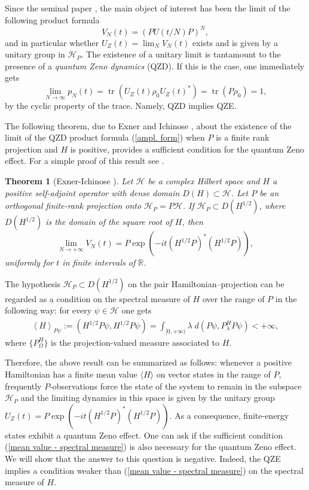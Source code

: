 \documentclass[aip,jmp,12pt
]{revtex4}
\newcommand{\tr}{\mathop{\mathrm{tr}}\nolimits}
\newcommand{\RM}{\mathbb{R}}
\newtheorem{theorem}{Theorem}
\theoremstyle{definition}
\begin{document}
Since the seminal paper \cite{misra}, the
main object of interest has been the limit of the
following product formula
\begin{equation}\label{ampl. form}
V_{N}(t)=(PU(t/N)P)^N ,
\end{equation}
and in particular whether $U_Z(t)= \lim_N V_N(t)$  exists and is given by a unitary group in
$\mathcal{H}_{P}$. The existence of a unitary limit is tantamount to the presence of a \emph{quantum Zeno dynamics} (QZD).
If this is the case, one immediately gets
\begin{equation*}
\lim_{N\to\infty} p_N(t)= \tr (U_Z(t)\rho_{0}U_Z(t)^{*})= \tr (P\rho_{0})=1,
\end{equation*}
by the cyclic property of the trace. Namely, QZD implies QZE.

The following theorem, due to Exner and Ichinose \cite{exner}, about the existence of the limit of the QZD product formula (\ref{ampl. form}) when $P$ is a finite rank projection and $H$ is positive, provides a sufficient condition for the quantum Zeno effect. For a simple proof of this result see \cite{EINZ}.

\begin{theorem}[Exner-Ichinose \cite{exner}]
\label{th:EI}
Let $\mathcal{H}$ be a complex Hilbert space and $H$ a
positive self-adjoint operator with dense domain $D(H)\subset \mathcal{H}$.
Let $P$ be an orthogonal finite-rank projection onto $\mathcal{H}_{P}=P\mathcal{H}$. If $\mathcal{H}_{P} \subset D(H^{1/2})$, where  $D(H^{1/2})$  is the domain of the square root of $H$,  then
\[
\lim_{N \to +\infty} V_{N}(t)= P\exp\left(-it(H^{1/2}P)^{*}(H^{1/2}P)\right) ,
\]
uniformly for $t$ in finite intervals of $\RM$.
\end{theorem}

The hypothesis $\mathcal{H}_{P} \subset D(H^{1/2})$ on the pair Hamiltonian--projection can be
regarded as a condition on the spectral measure of $H$ over the
range of $P$ in the following way: for every $\psi\in\mathcal{H}$ one gets
\begin{eqnarray}\label{mean value - spectral measure}
\left\langle H\right\rangle_{P\psi} := (H^{1/2}P \psi,H^{1/2}P \psi)
= \int_{[0, +\infty)} 
\lambda \; d(P \psi, P_{\lambda}^H P \psi) < +\infty ,
\end{eqnarray}
where $\{P_{\Omega}^H\}$ is the projection-valued measure associated
to $H$.

Therefore, the above result can be summarized as follows: whenever a positive Hamiltonian
has a finite mean value  $\langle H \rangle$ on vector states in the range of $P$, frequently
$P$-observations force the state of the system to remain in the
subspace $\mathcal{H}_{P}$ and the limiting dynamics in this space is given by
the unitary group $U_{Z}(t)=P \exp(-it(H^{1/2}P)^*(H^{1/2}P))$. As a consequence,
finite-energy states 
exhibit a quantum Zeno effect. One can ask if the sufficient condition (\ref{mean value - spectral measure}) is also necessary for the
quantum Zeno effect. We will show that the answer to this question is negative. Indeed,
the QZE implies a  condition weaker than (\ref{mean value - spectral
measure}) on the spectral measure of $H$.
\end{document}
